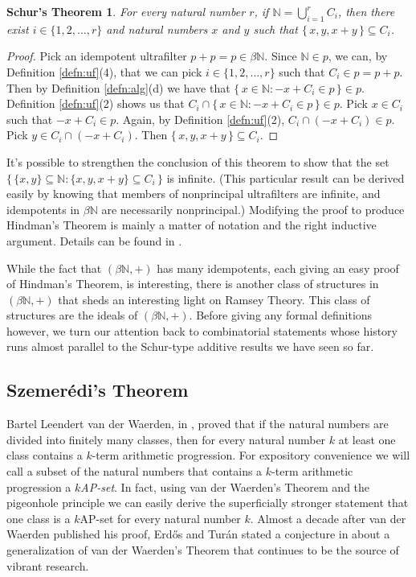 \documentclass[12pt]{article}
\theoremstyle{plain}
\newtheorem{schur}[thm]{Schur's Theorem}
\theoremstyle{definition}
\newcommand{\bbN}{\mathbb{N}}
\begin{document}
  \begin{schur}
    For every natural number $r$, if  \/ $\bbN = \bigcup_{i=1}^r C_i$,
    then there exist $i \in \{1, 2, \ldots, r\}$ and natural numbers
    $x$ and $y$ such that $\{\, x, y, x+y \,\} \subseteq C_i$.
  \end{schur}
  \begin{proof}
    Pick an idempotent ultrafilter $p + p = p \in \beta\bbN$. 
    Since $\bbN \in p$, we can, by Definition \ref{defn:uf}(4),
    that we can pick $i \in \{1, 2, \ldots, r\}$ such that $C_i \in p
    = p + p$. 
    Then by Definition \ref{defn:alg}(d) we have that $\{\, x \in \bbN : -x
    + C_i \in p \,\} \in p$.
    Definition \ref{defn:uf}(2) shows us that $C_i \cap
    \{\, x\in \bbN : -x + C_i \in p \,\} \in p$.
    Pick $x \in C_i$ such that $-x+C_i \in p$.
    Again, by Definition \ref{defn:uf}(2), $C_i \cap (-x+C_i) \in p$.
    Pick $y \in C_i \cap (-x+C_i)$.
    Then $\{\, x, y, x+y\,\} \subseteq C_i$.
  \end{proof}
It's possible to strengthen the conclusion of this theorem to show
that the set $\bigl\{\, \{x, y\} \subseteq \bbN : \{x, y, x+y\}
\subseteq C_i\,\bigr\}$ is infinite.
(This particular result can be derived easily by knowing that members
of nonprincipal ultrafilters are infinite, and idempotents in
$\beta\bbN$ are necessarily nonprincipal.)
Modifying the proof to produce Hindman's Theorem is mainly a matter of
notation and the right inductive argument.
Details can be found in \cite[Theorem 5.8]{Hindman:1998fk}. 

While the fact that $(\beta\bbN, +)$ has many idempotents, each giving
an easy proof of Hindman's Theorem, is interesting, there is another
class of structures in $(\beta\bbN, +)$ that sheds an interesting
light on Ramsey Theory. 
This class of structures are the ideals of $(\beta\bbN, +)$.
Before giving any formal definitions however, we turn our attention
back to combinatorial statements whose history runs almost parallel to
the Schur-type additive results we have seen so far.

\subsection{Szemer\'{e}di's Theorem}
Bartel Leendert van der Waerden, in \cite{Van-der-Waerden:1927fk},
proved that if the natural numbers are divided into finitely many
classes, then for every natural number $k$ at least one class contains
a $k$-term arithmetic progression. 
For expository convenience we will call a subset of the natural
numbers that contains a $k$-term arithmetic progression a
\textsl{$k$AP-set}.
In fact, using van der Waerden's Theorem and the pigeonhole principle
we can easily derive the superficially stronger statement that one
class is a $k$AP-set for every natural number $k$.
Almost a decade after van der Waerden published his proof, Erd\H{o}s
and Tur\'{a}n stated a conjecture in \cite{Erdos:1936fk} about a
generalization of van der Waerden's Theorem that continues to be the
source of vibrant research.
\end{document}
